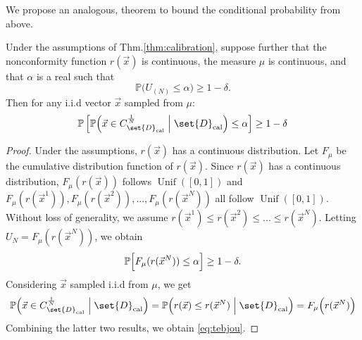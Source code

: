 \documentclass[pmlr]{jmlr}%
\begin{document}
%
We propose an analogous, theorem to bound the conditional probability from above.
\begin{theorem}\label{thm:Tebjou}
Under the assumptions of Thm.\;\ref{thm:calibration}, 
suppose further that the nonconformity function $r(\Vec{x})$ is continuous, the measure $\mu$ is continuous, and that 
$\alpha$ is a real such that 
$$\mathbb{P}\bigl(U_{(N)} \leq \alpha \bigr) \geq 1-\delta. $$ 
Then for any i.i.d vector $\Vec{x}$ sampled from $\mu$:
%
\begin{equation}\label{eq:tebjou}
    \mathbb{P}\left[\mathbb{P}\Bigl( \Vec{x} \in C_{\set{D}_\mathrm{cal}}^{\frac{1}{N}} \Bigm| \set{D}_\mathrm{cal}\Bigr)  \leq \alpha \right] \geq 1-\delta
\end{equation}
\end{theorem}
%
\begin{proof}
%
Under the assumptions, $r(\Vec{x})$ has a continuous distribution.
Let $F_{\mu}$ be the cumulative distribution function of $r(\Vec{x})$. Since $r(\Vec{x})$ has a continuous distribution, $F_{\mu}(r(\Vec{x}))$ follows $\operatorname{Unif}([0,1])$ and $F_{\mu}(r(\Vec{x}^1)),F_{\mu}(r(\Vec{x}^2)),...,F_{\mu}(r(\Vec{x}^N))$ all follow $\operatorname{Unif}([0,1])$.
Without loss of generality, we assume $r(\Vec{x}^1) \leq r(\Vec{x}^2) \leq ... \leq r(\Vec{x}^N)$. Letting $U_N = F_{\mu}(r(\Vec{x}^N))$, we obtain 
   $$\mathbb{P}\Bigl[ F_{\mu}(r(\Vec{x}^N)) \leq \alpha \Bigr] \geq 1-\delta.$$ 
    Considering $\Vec{x}$ sampled i.i.d from $\mu$, we get
    \[ \mathbb{P}\Bigl( \Vec{x} \in C_{\set{D}_\mathrm{cal}}^{\frac{1}{N}} \Bigm| \set{D}_\mathrm{cal}\Bigr) = \mathbb{P}\Bigl(r(\Vec{x}) \leq r(\Vec{x}^N) \Bigm| \set{D}_\mathrm{cal}\Bigr) = F_{\mu}\Bigl(r(\Vec{x}^N)\Bigr) \] 
    Combining the latter two results, we obtain \eqref{eq:tebjou}.
%
\end{proof}
\end{document}

